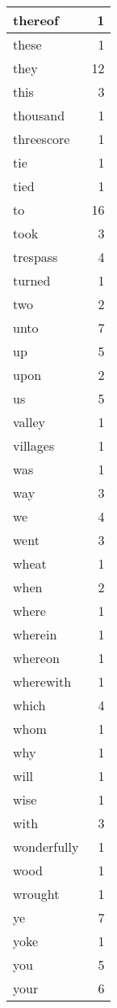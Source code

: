 \begin{center}
\begin{longtable}{l|r}
thereof & 1 \\ \hline
these & 1 \\ \hline
they & 12 \\ \hline
this & 3 \\ \hline
thousand & 1 \\ \hline
threescore & 1 \\ \hline
tie & 1 \\ \hline
tied & 1 \\ \hline
to & 16 \\ \hline
took & 3 \\ \hline
trespass & 4 \\ \hline
turned & 1 \\ \hline
two & 2 \\ \hline
unto & 7 \\ \hline
up & 5 \\ \hline
upon & 2 \\ \hline
us & 5 \\ \hline
valley & 1 \\ \hline
villages & 1 \\ \hline
was & 1 \\ \hline
way & 3 \\ \hline
we & 4 \\ \hline
went & 3 \\ \hline
wheat & 1 \\ \hline
when & 2 \\ \hline
where & 1 \\ \hline
wherein & 1 \\ \hline
whereon & 1 \\ \hline
wherewith & 1 \\ \hline
which & 4 \\ \hline
whom & 1 \\ \hline
why & 1 \\ \hline
will & 1 \\ \hline
wise & 1 \\ \hline
with & 3 \\ \hline
wonderfully & 1 \\ \hline
wood & 1 \\ \hline
wrought & 1 \\ \hline
ye & 7 \\ \hline
yoke & 1 \\ \hline
you & 5 \\ \hline
your & 6 \\ \hline
\end{longtable}
\end{center}



